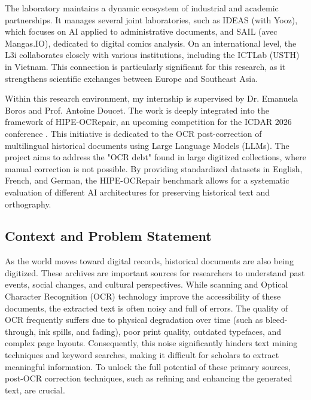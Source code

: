 \documentclass[11pt]{extarticle}
\begin{document}
The laboratory maintains a dynamic ecosystem of industrial and academic partnerships. It manages several joint laboratories, such as IDEAS (with Yooz), which focuses on AI applied to administrative documents, and SAIL (avec Mangas.IO), dedicated to digital comics analysis. On an international level, the L3i collaborates closely with various institutions, including the ICTLab (USTH) in Vietnam. This connection is particularly significant for this research, as it strengthens scientific exchanges between Europe and Southeast Asia.

Within this research environment, my internship is supervised by Dr. Emanuela Boros and Prof. Antoine Doucet. The work is deeply integrated into the framework of HIPE-OCRepair\cite{hipe_ocrepair_2026}, an upcoming competition for the ICDAR 2026 conference \cite{icdar_2026}. This initiative is dedicated to the OCR post-correction of multilingual historical documents using Large Language Models (LLMs). The project aims to address the "OCR debt" found in large digitized collections, where manual correction is not possible. By providing standardized datasets in English, French, and German, the HIPE-OCRepair benchmark allows for a systematic evaluation of different AI architectures for preserving historical text and orthography.

\subsection{Context and Problem Statement}
As the world moves toward digital records, historical documents are also being digitized. These archives are important sources for researchers to understand past events, social changes, and cultural perspectives. While scanning and Optical Character Recognition (OCR) technology improve the accessibility of these documents, the extracted text is often noisy and full of errors. The quality of OCR frequently suffers due to physical degradation over time (such as bleed-through, ink spills, and fading), poor print quality, outdated typefaces, and complex page layouts. Consequently, this noise significantly hinders text mining techniques and keyword searches, making it difficult for scholars to extract meaningful information. To unlock the full potential of these primary sources, post-OCR correction techniques, such as refining and enhancing the generated text, are crucial. 
\end{document}
